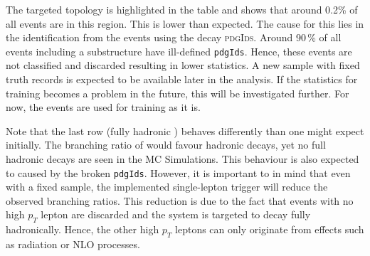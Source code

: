 \documentclass[bachelor,ngerman,english]{GAUBM}
\begin{document}
The targeted topology is highlighted in the table and shows that around 0.2\% of all events are in this region. This is lower than expected. The cause for this lies in the identification from the events using the decay \textsc{pdgIds}. Around 90\,\% of all events including a \HWW substructure have ill-defined \texttt{pdgIds}. Hence, these events are not classified and discarded resulting in lower statistics. A new sample with fixed truth records is expected to be available later in the analysis. If the statistics for training \spanet becomes a problem in the future, this will be investigated further. For now, the events are used for training as it is.

Note that the last row (fully hadronic \HWW) behaves differently than one might expect initially. The branching ratio of \wbosons would favour hadronic decays, yet no full hadronic decays are seen in the MC Simulations. This behaviour is also expected to caused by the broken \texttt{pdgIds}. However, it is important to in mind that even with a fixed sample, the implemented single-lepton trigger will reduce the observed branching ratios. This reduction is due to the fact that events with no high $p_T$ lepton are discarded and the \ttbar system is targeted to decay fully hadronically. Hence, the other high $p_T$ leptons can only originate from effects such as radiation or NLO processes. %
\end{document}
